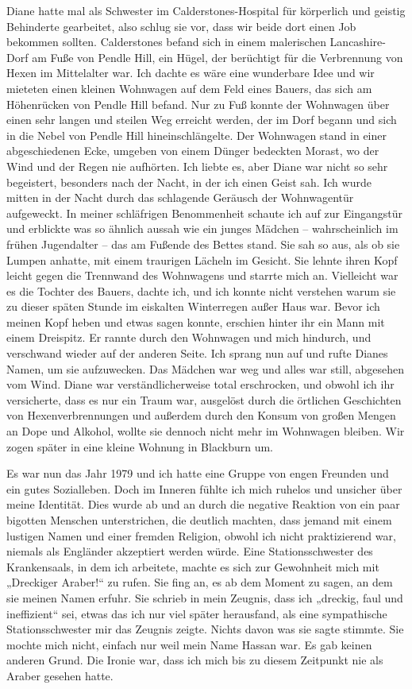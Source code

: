 \documentclass[12pt]{memoir}
\begin{document}
Diane hatte mal als Schwester im Calderstones-Hospital für körperlich
und geistig Behinderte gearbeitet, also schlug sie vor,
dass wir beide dort einen Job bekommen sollten.
Calderstones befand sich in einem malerischen Lancashire-Dorf
am Fuße von Pendle Hill, ein Hügel,
der berüchtigt für die Verbrennung von Hexen im Mittelalter war.
Ich dachte es wäre eine wunderbare Idee
und wir mieteten einen kleinen Wohnwagen auf dem Feld eines Bauers,
das sich am Höhenrücken von Pendle Hill befand.
Nur zu Fuß konnte der Wohnwagen über einen sehr langen
und steilen Weg erreicht werden,
der im Dorf begann und sich in die Nebel von Pendle Hill hineinschlängelte.
Der Wohnwagen stand in einer abgeschiedenen Ecke,
umgeben von einem Dünger bedeckten Morast,
wo der Wind und der Regen nie aufhörten.
Ich liebte es, aber Diane war nicht so sehr begeistert,
besonders nach der Nacht, in der ich einen Geist sah.
Ich wurde mitten in der Nacht durch das schlagende Geräusch
der Wohnwagentür aufgeweckt.
In meiner schläfrigen Benommenheit schaute ich auf zur Eingangstür
und erblickte was so ähnlich aussah wie ein junges Mädchen –
wahrscheinlich im frühen Jugendalter –
das am Fußende des Bettes stand.
Sie sah so aus, als ob sie Lumpen anhatte,
mit einem traurigen Lächeln im Gesicht.
Sie lehnte ihren Kopf leicht gegen die Trennwand des Wohnwagens
und starrte mich an.
Vielleicht war es die Tochter des Bauers, dachte ich,
und ich konnte nicht verstehen warum sie zu dieser späten Stunde
im eiskalten Winterregen außer Haus war.
Bevor ich meinen Kopf heben und etwas sagen konnte,
erschien hinter ihr ein Mann mit einem Dreispitz.
Er rannte durch den Wohnwagen und mich hindurch,
und verschwand wieder auf der anderen Seite.
Ich sprang nun auf und rufte Dianes Namen, um sie aufzuwecken.
Das Mädchen war weg und alles war still, abgesehen vom Wind.
Diane war verständlicherweise total erschrocken,
und obwohl ich ihr versicherte, dass es nur ein Traum war,
ausgelöst durch die örtlichen Geschichten von Hexenverbrennungen
und außerdem durch den Konsum von großen Mengen an Dope und Alkohol,
wollte sie dennoch nicht mehr im Wohnwagen bleiben.
Wir zogen später in eine kleine Wohnung in Blackburn um.

Es war nun das Jahr 1979 und ich hatte eine Gruppe
von engen Freunden und ein gutes Sozialleben.
Doch im Inneren fühlte ich mich ruhelos und unsicher über meine Identität.
Dies wurde ab und an durch die negative Reaktion
von ein paar bigotten Menschen unterstrichen,
die deutlich machten, dass jemand mit einem lustigen Namen
und einer fremden Religion, obwohl ich nicht praktizierend war,
niemals als Engländer akzeptiert werden würde.
Eine Stationsschwester des Krankensaals, in dem ich arbeitete,
machte es sich zur Gewohnheit mich mit „Dreckiger Araber!“ zu rufen.
Sie fing an, es ab dem Moment zu sagen, an dem sie meinen Namen erfuhr.
Sie schrieb in mein Zeugnis, dass ich „dreckig, faul und ineffizient“ sei,
etwas das ich nur viel später herausfand,
als eine sympathische Stationsschwester mir das Zeugnis zeigte.
Nichts davon was sie sagte stimmte.
Sie mochte mich nicht, einfach nur weil mein Name Hassan war.
Es gab keinen anderen Grund.
Die Ironie war, dass ich mich bis zu diesem Zeitpunkt
nie als Araber gesehen hatte.
\end{document}
